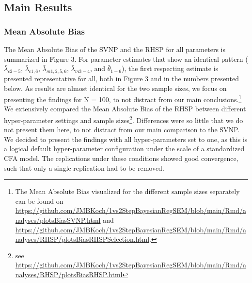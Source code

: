 \documentclass[
  man, donotrepeattitle,floatsintext]{apa6}
\begin{document}
\hypertarget{main-results}{%
\subsection{Main Results}\label{main-results}}

\hypertarget{mean-absolute-bias-1}{%
\subsubsection{Mean Absolute Bias}\label{mean-absolute-bias-1}}

The Mean Absolute Bias of the SVNP and the RHSP for all parameters is summarized in Figure 3. For parameter estimates that show an identical pattern (\(\bar{\lambda}_{c 2-5}\), \(\bar{\lambda}_{c 1, 6}\), \(\bar{\lambda}_{m 1, 2, 5, 6}\), \(\bar{\lambda}_{m 3-4}\), and \(\bar{\theta}_{1-6}\)), the first respecting estimate is presented representative for all, both in Figure 3 and in the numbers presented below. As results are almost identical for the two sample sizes, we focus on presenting the findings for N = 100, to not distract from our main conclusions.\footnote{The Mean Absolute Bias visualized for the different sample sizes separately can be found on \url{https://github.com/JMBKoch/1vs2StepBayesianRegSEM/blob/main/Rmd/analyses/plotsBiasSVNP.html} and \url{https://github.com/JMBKoch/1vs2StepBayesianRegSEM/blob/main/Rmd/analyses/RHSP/plotsBiasRHSPSelection.html}.} We extensively compared the Mean Absolute Bias of the RHSP between different hyper-parameter settings and sample sizes\footnote{see \url{https://github.com/JMBKoch/1vs2StepBayesianRegSEM/blob/main/Rmd/analyses/RHSP/plotsBiasRHSP.html}}. Differences were so little that we do not present them here, to not distract from our main comparison to the SVNP. We decided to present the findings with all hyper-parameters set to one, as this is a logical default hyper-parameter configuration under the scale of a standardized CFA model. The replications under these conditions showed good convergence, such that only a single replication had to be removed.
\end{document}
